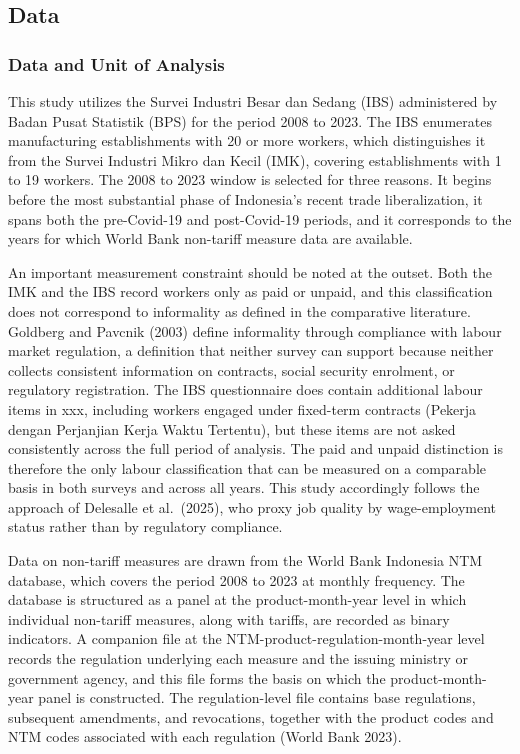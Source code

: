 \documentclass[
  manuscript=article,
  layout=publish,
  year=2026,
  volume=1,
]{den}
\begin{document}
\subsection{Data}\label{data}

\subsubsection{Data and Unit of
Analysis}\label{data-and-unit-of-analysis}

This study utilizes the Survei Industri Besar dan Sedang (IBS)
administered by Badan Pusat Statistik (BPS) for the period 2008 to 2023.
The IBS enumerates manufacturing establishments with 20 or more workers,
which distinguishes it from the Survei Industri Mikro dan Kecil (IMK),
covering establishments with 1 to 19 workers. The 2008 to 2023 window is
selected for three reasons. It begins before the most substantial phase
of Indonesia's recent trade liberalization, it spans both the
pre-Covid-19 and post-Covid-19 periods, and it corresponds to the years
for which World Bank non-tariff measure data are available.

An important measurement constraint should be noted at the outset. Both
the IMK and the IBS record workers only as paid or unpaid, and this
classification does not correspond to informality as defined in the
comparative literature. Goldberg and Pavcnik (2003) define informality
through compliance with labour market regulation, a definition that
neither survey can support because neither collects consistent
information on contracts, social security enrolment, or regulatory
registration. The IBS questionnaire does contain additional labour items
in xxx, including workers engaged under fixed-term contracts (Pekerja
dengan Perjanjian Kerja Waktu Tertentu), but these items are not asked
consistently across the full period of analysis. The paid and unpaid
distinction is therefore the only labour classification that can be
measured on a comparable basis in both surveys and across all years.
This study accordingly follows the approach of Delesalle et al.~(2025),
who proxy job quality by wage-employment status rather than by
regulatory compliance.

Data on non-tariff measures are drawn from the World Bank Indonesia NTM
database, which covers the period 2008 to 2023 at monthly frequency. The
database is structured as a panel at the product-month-year level in
which individual non-tariff measures, along with tariffs, are recorded
as binary indicators. A companion file at the
NTM-product-regulation-month-year level records the regulation
underlying each measure and the issuing ministry or government agency,
and this file forms the basis on which the product-month-year panel is
constructed. The regulation-level file contains base regulations,
subsequent amendments, and revocations, together with the product codes
and NTM codes associated with each regulation (World Bank 2023).
\end{document}
